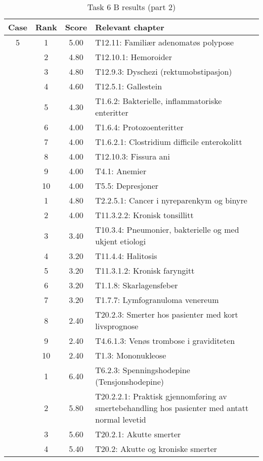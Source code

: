 \begin{table}[htbp] \footnotesize \center
\caption{Task 6 B results (part 2)\label{tab:task6b2}}
\begin{tabularx}{\textwidth}{c c c X}
    \toprule
    Case & Rank & Score & Relevant chapter \\
    \midrule
    5 & 1 & 5.00 & T12.11: Familiær adenomatøs polypose \\
     & 2 & 4.80 & T12.10.1: Hemoroider \\
     & 3 & 4.80 & T12.9.3: Dyschezi (rektumobstipasjon) \\
     & 4 & 4.60 & T12.5.1: Gallestein \\
     & 5 & 4.30 & T1.6.2: Bakterielle, inflammatoriske enteritter \\
     & 6 & 4.00 & T1.6.4: Protozoenteritter \\
     & 7 & 4.00 & T1.6.2.1: Clostridium difficile enterokolitt \\
     & 8 & 4.00 & T12.10.3: Fissura ani \\
     & 9 & 4.00 & T4.1: Anemier \\
     & 10 & 4.00 & T5.5: Depresjoner \\
	\addlinespace
    6 & 1 & 4.80 & T2.2.5.1: Cancer i nyreparenkym og binyre \\
     & 2 & 4.00 & T11.3.2.2: Kronisk tonsillitt \\
     & 3 & 3.40 & T10.3.4: Pneumonier, bakterielle og med ukjent etiologi \\
     & 4 & 3.20 & T11.4.4: Halitosis \\
     & 5 & 3.20 & T11.3.1.2: Kronisk faryngitt \\
     & 6 & 3.20 & T1.1.8: Skarlagensfeber \\
     & 7 & 3.20 & T1.7.7: Lymfogranuloma venereum \\
     & 8 & 2.40 & T20.2.3: Smerter hos pasienter med kort livsprognose \\
     & 9 & 2.40 & T4.6.1.3: Venøs trombose i graviditeten \\
     & 10 & 2.40 & T1.3: Mononukleose \\
	\addlinespace
    7 & 1 & 6.40 & T6.2.3: Spenningshodepine (Tensjonshodepine) \\
     & 2 & 5.80 & T20.2.2.1: Praktisk gjennomføring av smertebehandling hos pasienter med antatt normal levetid \\
     & 3 & 5.60 & T20.2.1: Akutte smerter \\
     & 4 & 5.40 & T20.2: Akutte og kroniske smerter \\

\end{tabularx}
\end{table}
